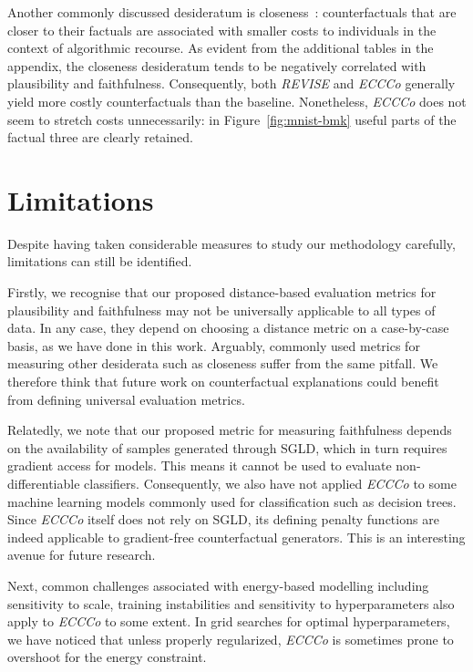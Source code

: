 Another commonly discussed desideratum is closeness~\citep{wachter2017counterfactual}: counterfactuals that are closer to their factuals are associated with smaller costs to individuals in the context of algorithmic recourse. As evident from the additional tables in the appendix, the closeness desideratum tends to be negatively correlated with plausibility and faithfulness. Consequently, both \textit{REVISE} and \textit{ECCCo} generally yield more costly counterfactuals than the baseline. Nonetheless, \textit{ECCCo} does not seem to stretch costs unnecessarily: in Figure~\ref{fig:mnist-bmk} useful parts of the factual three are clearly retained.

\section{Limitations}

Despite having taken considerable measures to study our methodology carefully, limitations can still be identified. 

Firstly, we recognise that our proposed distance-based evaluation metrics for plausibility and faithfulness may not be universally applicable to all types of data. In any case, they depend on choosing a distance metric on a case-by-case basis, as we have done in this work. Arguably, commonly used metrics for measuring other desiderata such as closeness suffer from the same pitfall. We therefore think that future work on counterfactual explanations could benefit from defining universal evaluation metrics. 

Relatedly, we note that our proposed metric for measuring faithfulness depends on the availability of samples generated through SGLD, which in turn requires gradient access for models. This means it cannot be used to evaluate non-differentiable classifiers. Consequently, we also have not applied \textit{ECCCo} to some machine learning models commonly used for classification such as decision trees. Since \textit{ECCCo} itself does not rely on SGLD, its defining penalty functions are indeed applicable to gradient-free counterfactual generators. This is an interesting avenue for future research.

Next, common challenges associated with energy-based modelling including sensitivity to scale, training instabilities and sensitivity to hyperparameters also apply to \textit{ECCCo} to some extent. In grid searches for optimal hyperparameters, we have noticed that unless properly regularized, \textit{ECCCo} is sometimes prone to overshoot for the energy constraint. 

